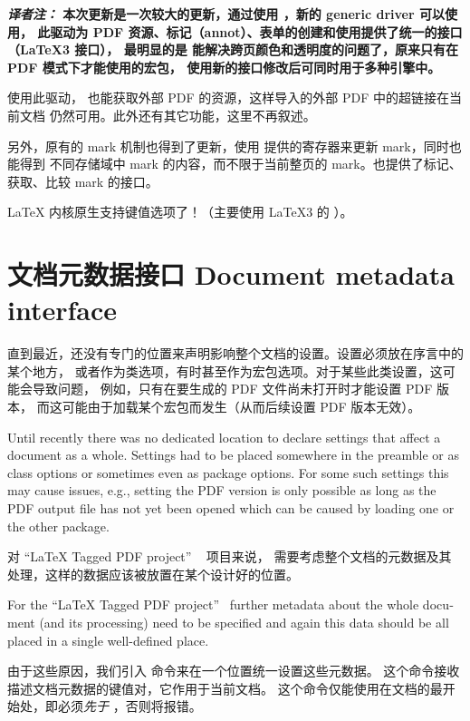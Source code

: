 \documentclass{ltnews}
\providecommand\eTeX{\hologo{eTeX}}
\providecommand\XeTeX{\hologo{XeTeX}}
\newcommand{\transnote}[1]{\par{\bfseries \textit{译者注：}#1}\par}
\begin{document}
\transnote{%
本次更新是一次较大的更新，通过使用 ，新的 generic driver 可以使用，
此驱动为 PDF 资源、标记（annot）、表单的创建和使用提供了统一的接口（\LaTeX3 接口），
最明显的是 \XeTeX{} 能解决跨页颜色和透明度的问题了，原来只有在 PDF 模式下才能使用的宏包，
使用新的接口修改后可同时用于多种引擎中。

使用此驱动，\XeTeX{} 也能获取外部 PDF 的资源，这样导入的外部 PDF 中的超链接在当前文档
仍然可用。此外还有其它功能，这里不再叙述。

另外，原有的 mark 机制也得到了更新，使用 \eTeX{} 提供的寄存器来更新 mark，同时也能得到
不同存储域中 mark 的内容，而不限于当前整页的 mark。也提供了标记、获取、比较 mark 的接口。

\LaTeX{} 内核原生支持键值选项了！（主要使用 \LaTeX3 的 \pkg{l3keys}）。
}

\section{文档元数据接口 Document metadata interface}

直到最近，还没有专门的位置来声明影响整个文档的设置。设置必须放在序言中的某个地方，
或者作为类选项，有时甚至作为宏包选项。对于某些此类设置，这可能会导致问题，
例如，只有在要生成的 PDF 文件尚未打开时才能设置 PDF 版本，
而这可能由于加载某个宏包而发生（从而后续设置 PDF 版本无效）。

\begin{english}
Until recently there was no dedicated location to declare
settings that affect a document as a whole. Settings had to be placed
somewhere in the preamble or as class options or sometimes even as
package options. For some such settings this may cause issues, e.g.,
setting the PDF version is only possible as long as the PDF output
file has not yet been opened which can be caused by loading one or the
other package.
\end{english}

对 \enquote{\LaTeX{} Tagged PDF project} ~\cite{35:blueprint} 项目来说，
需要考虑整个文档的元数据及其处理，这样的数据应该被放置在某个设计好的位置。

\begin{english}
For the \enquote{\LaTeX{} Tagged PDF project}~\cite{35:blueprint}
further metadata about the whole document (and its processing) need to
be specified and again this data should be all placed in a single
well-defined place.
\end{english}

由于这些原因，我们引入  命令来在一个位置统一设置这些元数据。
这个命令接收描述文档元数据的键值对，它作用于当前文档。
这个命令仅能使用在文档的最开始处，即必须\emph{先于} ，否则将报错。
\end{document}
